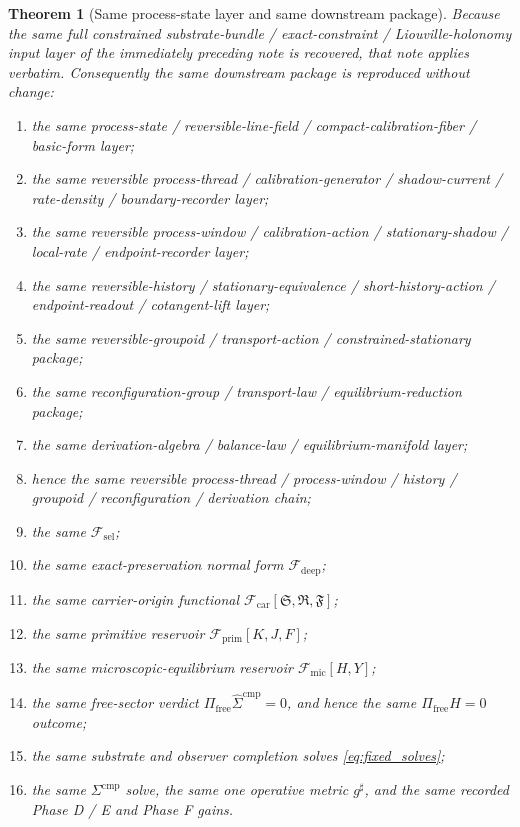 \documentclass[11pt]{article}
\newcommand{\CompletedMetric}{g^{\sharp}}
\newcommand{\CompLift}{\widehat\Sigma^{\mathrm{cmp}}}
\newcommand{\FreeProj}{\Pi_{\mathrm{free}}}
\newcommand{\GaugeAux}{Y}
\newcommand{\MicFunctional}{\mathscr F_{\mathrm{mic}}}
\newcommand{\PrimFunctional}{\mathscr F_{\mathrm{prim}}}
\newcommand{\CarrierFunctional}{\mathscr F_{\mathrm{car}}}
\newcommand{\DeepFunctional}{\mathscr F_{\mathrm{deep}}}
\newcommand{\StemFunctional}{\mathscr F_{\mathrm{sel}}}
\newcommand{\PrimStrain}{K}
\newcommand{\PrimNeutral}{J}
\newcommand{\PrimFree}{F}
\newcommand{\CarrierSeed}{\mathfrak S}
\newcommand{\RelabelSeed}{\mathfrak R}
\newcommand{\FreeSeed}{\mathfrak F}
\newtheorem{theorem}{Theorem}
\begin{document}
\begin{theorem}[Same process-state layer and same downstream package]
\label{thm:same_package}
Because the same full constrained substrate-bundle / exact-constraint / Liouville-holonomy input layer of the immediately preceding note is recovered, that note applies verbatim. Consequently the same downstream package is reproduced without change:
\begin{enumerate}
    \item the same process-state / reversible-line-field / compact-calibration-fiber / basic-form layer;
    \item the same reversible process-thread / calibration-generator / shadow-current / rate-density / boundary-recorder layer;
    \item the same reversible process-window / calibration-action / stationary-shadow / local-rate / endpoint-recorder layer;
    \item the same reversible-history / stationary-equivalence / short-history-action / endpoint-readout / cotangent-lift layer;
    \item the same reversible-groupoid / transport-action / constrained-stationary package;
    \item the same reconfiguration-group / transport-law / equilibrium-reduction package;
    \item the same derivation-algebra / balance-law / equilibrium-manifold layer;
    \item hence the same reversible process-thread / process-window / history / groupoid / reconfiguration / derivation chain;
    \item the same \(\StemFunctional\);
    \item the same exact-preservation normal form \(\DeepFunctional\);
    \item the same carrier-origin functional \(\CarrierFunctional[\CarrierSeed,\RelabelSeed,\FreeSeed]\);
    \item the same primitive reservoir \(\PrimFunctional[\PrimStrain,\PrimNeutral,\PrimFree]\);
    \item the same microscopic-equilibrium reservoir \(\MicFunctional[H,\GaugeAux]\);
    \item the same free-sector verdict \(\FreeProj\CompLift=0\), and hence the same \(\Pi_{\mathrm{free}}H=0\) outcome;
    \item the same substrate and observer completion solves \eqref{eq:fixed_solves};
    \item the same \(\Sigma^{\mathrm{cmp}}\) solve, the same one operative metric \(\CompletedMetric\), and the same recorded Phase D / E and Phase F gains.
\end{enumerate}
\end{theorem}
\end{document}
